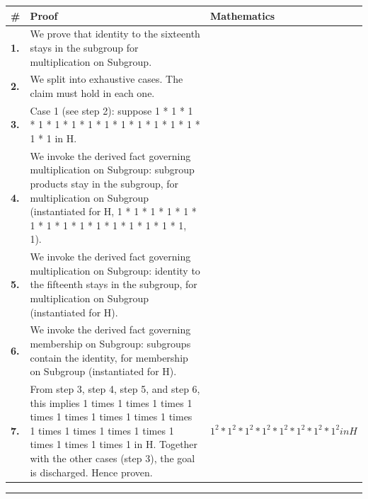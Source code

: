 \documentclass[11pt]{article}
\theoremstyle{definition}
\begin{document}
\begin{tabular}{@{} >{\raggedright\arraybackslash}p{} >{\raggedright\arraybackslash}p{} >{\raggedleft\arraybackslash}p{} @{}}
\textbf{\#} & \textbf{Proof} & \textbf{Mathematics} \\
\midrule
\textbf{1.} & We prove that identity to the sixteenth stays in the subgroup for multiplication on Subgroup. & \\[0.45em]
\textbf{2.} & We split into exhaustive cases. The claim must hold in each one. & \\[0.45em]
\textbf{3.} & Case 1 (see step 2): suppose 1 * 1 * 1 * 1 * 1 * 1 * 1 * 1 * 1 * 1 * 1 * 1 * 1 * 1 * 1 in H. & \\[0.45em]
\textbf{4.} & We invoke the derived fact governing multiplication on Subgroup: subgroup products stay in the subgroup, for multiplication on Subgroup (instantiated for H, 1 * 1 * 1 * 1 * 1 * 1 * 1 * 1 * 1 * 1 * 1 * 1 * 1 * 1 * 1, 1). & \\[0.45em]
\textbf{5.} & We invoke the derived fact governing multiplication on Subgroup: identity to the fifteenth stays in the subgroup, for multiplication on Subgroup (instantiated for H). & \\[0.45em]
\textbf{6.} & We invoke the derived fact governing membership on Subgroup: subgroups contain the identity, for membership on Subgroup (instantiated for H). & \\[0.45em]
\textbf{7.} & From step 3, step 4, step 5, and step 6, this implies 1 times 1 times 1 times 1 times 1 times 1 times 1 times 1 times 1 times 1 times 1 times 1 times 1 times 1 times 1 times 1 in H. Together with the other cases (step 3), the goal is discharged. Hence proven. & $\displaystyle 1^{2} * 1^{2} * 1^{2} * 1^{2} * 1^{2} * 1^{2} * 1^{2} * 1^{2} in H$ \\[0.45em]
\bottomrule
\end{tabular}
\label{thm:Subgroup-multiplication-identity_to_the_sixteenth_stays_in_the_subgroup}
\par\medskip\hrule
\end{document}
